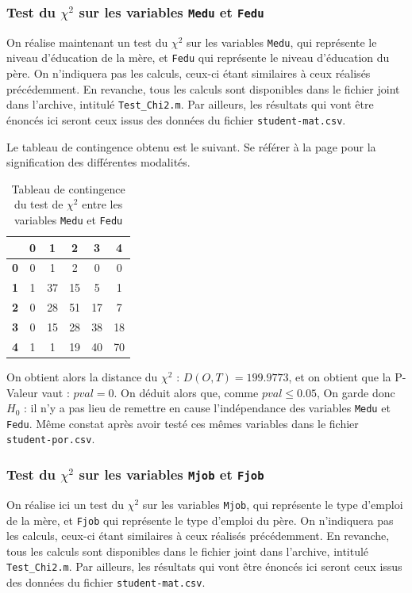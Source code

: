 \documentclass[11pt]{article}
\begin{document}
\subsubsection{Test du $\chi^2$ sur les variables \texttt{Medu} et \texttt{Fedu}}
On réalise maintenant un test du $\chi^2$ sur les variables \texttt{Medu}, qui représente le niveau d'éducation de la mère, et \texttt{Fedu} qui représente le niveau d'éducation du père. On n'indiquera pas les calculs, ceux-ci étant similaires à ceux réalisés précédemment. En revanche, tous les calculs sont disponibles dans le fichier joint dans l'archive, intitulé \texttt{Test\_Chi2.m}. Par ailleurs, les résultats qui vont être énoncés ici seront ceux issus des données du fichier \texttt{student-mat.csv}. 

Le tableau de contingence obtenu est le suivant. Se référer à la page \pageref{rap1} pour la signification des différentes modalités.
\begin{table}[h] \centering \caption{Tableau de contingence du test de $\chi^2$ entre les variables \texttt{Medu} et \texttt{Fedu}}
\begin{tabular}{|c|c|c|c|c|c|}
  \hline
 	\backslashbox{\textbf{\emph{Medu}}}{\textbf{\emph{Fedu}}}& \textbf{0} &\textbf{1} & \textbf{2} & \textbf{3} & \textbf{4} \\
  \hline
          
            \textbf{0}&   0 &    1 &    2 &    0 &    0 \\\hline
     	\textbf{1} &1   & 37    &15   &  5     &1\\\hline
    \textbf{2} & 0   & 28    &51    &17     &7\\\hline
     \textbf{3} & 0  &  15   & 28  &  38  &  18\\\hline
     \textbf{4} &1    & 1   & 19  &  40    &70  \\\hline        \end{tabular}
\end{table}

On obtient alors la distance du $\chi^2$ : $D(O,T)=199.9773$, et on obtient que la P-Valeur vaut : $pval = 0$. On déduit alors que, comme $pval\leq 0.05$, On garde donc $H_0$ : il n'y a pas lieu de remettre en cause l'indépendance des variables \texttt{Medu} et \texttt{Fedu}. Même constat après avoir testé ces mêmes variables dans le fichier \texttt{student-por.csv}.

\subsubsection{Test du $\chi^2$ sur les variables \texttt{Mjob} et \texttt{Fjob}}
On réalise ici un test du $\chi^2$ sur les variables \texttt{Mjob}, qui représente le type d'emploi de la mère, et \texttt{Fjob} qui représente le type d'emploi du père. On n'indiquera pas les calculs, ceux-ci étant similaires à ceux réalisés précédemment. En revanche, tous les calculs sont disponibles dans le fichier joint dans l'archive, intitulé \texttt{Test\_Chi2.m}. Par ailleurs, les résultats qui vont être énoncés ici seront ceux issus des données du fichier \texttt{student-mat.csv}. 
\end{document}

